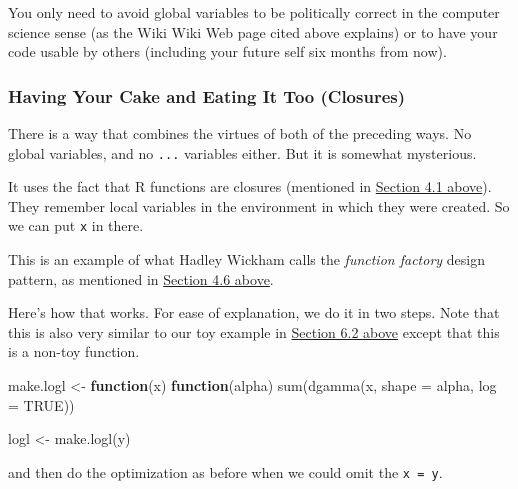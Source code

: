 \documentclass[
]{article}
\newenvironment{Shaded}{\begin{snugshade}}{\end{snugshade}}
\newcommand{\AttributeTok}[1]{\textcolor[rgb]{0.77,0.63,0.00}{#1}}
\newcommand{\ConstantTok}[1]{\textcolor[rgb]{0.00,0.00,0.00}{#1}}
\newcommand{\ControlFlowTok}[1]{\textcolor[rgb]{0.13,0.29,0.53}{\textbf{#1}}}
\newcommand{\FunctionTok}[1]{\textcolor[rgb]{0.00,0.00,0.00}{#1}}
\newcommand{\NormalTok}[1]{#1}
\newcommand{\OtherTok}[1]{\textcolor[rgb]{0.56,0.35,0.01}{#1}}
\newcommand{\SpecialCharTok}[1]{\textcolor[rgb]{0.00,0.00,0.00}{#1}}
\begin{document}
You only need to avoid global variables to be politically correct in the
computer science sense (as the Wiki Wiki Web page cited above explains)
or to have your code usable by others (including your future self six
months from now).

\hypertarget{factory}{%
\subsubsection{Having Your Cake and Eating It Too
(Closures)}\label{factory}}

There is a way that combines the virtues of both of the preceding ways.
No global variables, and no \texttt{...} variables either. But it is
somewhat mysterious.

It uses the fact that R functions are closures (mentioned in
\protect\hyperlink{functional-programming}{Section 4.1 above}). They
remember local variables in the environment in which they were created.
So we can put \texttt{x} in there.

This is an example of what Hadley Wickham calls the \emph{function
factory} design pattern, as mentioned in
\protect\hyperlink{functions-returning-functions-as-values}{Section 4.6
above}.

Here's how that works. For ease of explanation, we do it in two steps.
Note that this is also very similar to our toy example in
\protect\hyperlink{functions-whose-values-are-functions}{Section 6.2
above} except that this is a non-toy function.

\begin{Shaded}
\begin{Highlighting}[]
\NormalTok{make.logl }\OtherTok{\textless{}{-}} \ControlFlowTok{function}\NormalTok{(x) }\ControlFlowTok{function}\NormalTok{(alpha)}
    \FunctionTok{sum}\NormalTok{(}\FunctionTok{dgamma}\NormalTok{(x, }\AttributeTok{shape =}\NormalTok{ alpha, }\AttributeTok{log =} \ConstantTok{TRUE}\NormalTok{))}

\NormalTok{logl }\OtherTok{\textless{}{-}} \FunctionTok{make.logl}\NormalTok{(y)}
\end{Highlighting}
\end{Shaded}

and then do the optimization as before when we could omit the
\texttt{x\ =\ y}.

\begin{Shaded}
\end{Shaded}
\end{document}
